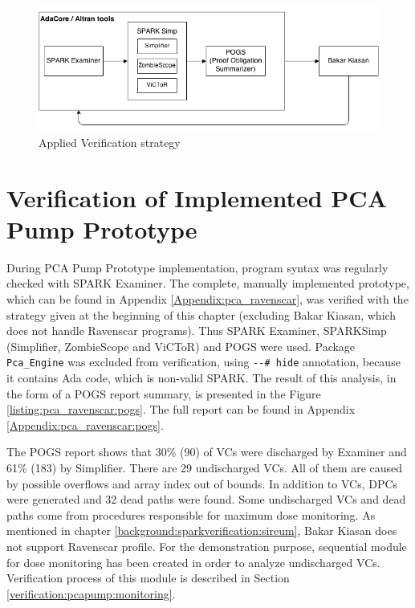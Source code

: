 \begin{figure}[ht]%
    \begin{center}
        \includegraphics[width=1.0\textwidth]{figures/spark-verification.png}        
    \end{center}
    \caption{Applied Verification strategy}
    \label{figure:sparkverificationstrategy}
\end{figure}

\section{Verification of Implemented PCA Pump Prototype}
\label{verification:prototype}

During PCA Pump Prototype implementation, program syntax was regularly checked with SPARK Examiner. The complete, manually implemented prototype, which can be found in Appendix \ref{Appendix:pca_ravenscar}, was verified with the strategy given at the beginning of this chapter (excluding Bakar Kiasan, which does not handle Ravenscar programs). Thus SPARK Examiner, SPARKSimp (Simplifier, ZombieScope and ViCToR) and POGS were used. Package \lstinline{Pca_Engine} was excluded from verification, using \lstinline{--# hide} annotation, because it contains Ada code, which is non-valid SPARK. The result of this analysis, in the form of a POGS report summary, is presented in the Figure \ref{listing:pca_ravenscar:pogs}. The full report can be found in Appendix \ref{Appendix:pca_ravenscar:pogs}.

The POGS report shows that 30\% (90) of VCs were discharged by Examiner and 61\% (183) by Simplifier. There are 29 undischarged VCs. All of them are caused by possible overflows and array index out of bounds. In addition to VCs, DPCs were generated and 32 dead paths were found. Some undischarged VCs and dead paths come from procedures responsible for maximum dose monitoring. As mentioned in chapter \ref{background:sparkverification:sireum}, Bakar Kiasan does not support Ravenscar profile. For the demonstration purpose, sequential module for dose monitoring has been created in order to analyze undischarged VCs. Verification process of this module is described in Section \ref{verification:pcapump:monitoring}.

